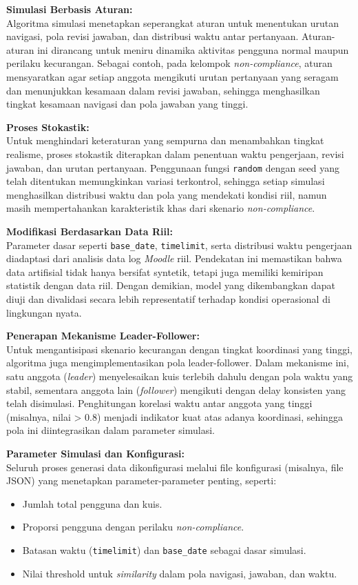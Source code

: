 \textbf{Simulasi Berbasis Aturan:} \\
Algoritma simulasi menetapkan seperangkat aturan untuk menentukan urutan navigasi, pola revisi jawaban, dan distribusi waktu antar pertanyaan. Aturan-aturan ini dirancang untuk meniru dinamika aktivitas pengguna normal maupun perilaku kecurangan. Sebagai contoh, pada kelompok \textit{non-compliance}, aturan mensyaratkan agar setiap anggota mengikuti urutan pertanyaan yang seragam dan menunjukkan kesamaan dalam revisi jawaban, sehingga menghasilkan tingkat kesamaan navigasi dan pola jawaban yang tinggi.

\textbf{Proses Stokastik:} \\
Untuk menghindari keteraturan yang sempurna dan menambahkan tingkat realisme, proses stokastik diterapkan dalam penentuan waktu pengerjaan, revisi jawaban, dan urutan pertanyaan. Penggunaan fungsi \texttt{random} dengan seed yang telah ditentukan memungkinkan variasi terkontrol, sehingga setiap simulasi menghasilkan distribusi waktu dan pola yang mendekati kondisi riil, namun masih mempertahankan karakteristik khas dari skenario \textit{non-compliance}.

\textbf{Modifikasi Berdasarkan Data Riil:} \\
Parameter dasar seperti \texttt{base\_date}, \texttt{timelimit}, serta distribusi waktu pengerjaan diadaptasi dari analisis data log \textit{Moodle} riil. Pendekatan ini memastikan bahwa data artifisial tidak hanya bersifat syntetik, tetapi juga memiliki kemiripan statistik dengan data riil. Dengan demikian, model yang dikembangkan dapat diuji dan divalidasi secara lebih representatif terhadap kondisi operasional di lingkungan nyata.

\textbf{Penerapan Mekanisme Leader-Follower:} \\
Untuk mengantisipasi skenario kecurangan dengan tingkat koordinasi yang tinggi, algoritma juga mengimplementasikan pola leader-follower. Dalam mekanisme ini, satu anggota (\textit{leader}) menyelesaikan kuis terlebih dahulu dengan pola waktu yang stabil, sementara anggota lain (\textit{follower}) mengikuti dengan delay konsisten yang telah disimulasi. Penghitungan korelasi waktu antar anggota yang tinggi (misalnya, nilai > 0.8) menjadi indikator kuat atas adanya koordinasi, sehingga pola ini diintegrasikan dalam parameter simulasi.

\textbf{Parameter Simulasi dan Konfigurasi:} \\
Seluruh proses generasi data dikonfigurasi melalui file konfigurasi (misalnya, file JSON) yang menetapkan parameter-parameter penting, seperti:
\begin{itemize}
    \item Jumlah total pengguna dan kuis.
    \item Proporsi pengguna dengan perilaku \textit{non-compliance}.
    \item Batasan waktu (\texttt{timelimit}) dan \texttt{base\_date} sebagai dasar simulasi.
    \item Nilai threshold untuk \textit{similarity} dalam pola navigasi, jawaban, dan waktu.
\end{itemize}

